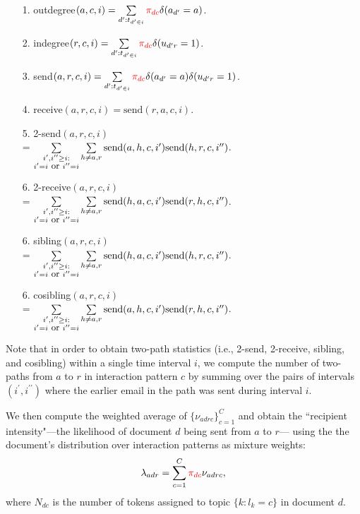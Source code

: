 \documentclass{article}
\begin{document}
\begin{itemize}
	\item[1.] outdegree$(a,c,i)=\sum\limits_{d^\prime:t_{d^\prime \in i}} \textcolor{red}{\pi_{dc}}\delta(a_{d^\prime} = a)$.
	\item[2.] indegree$(r,c,i)=\sum\limits_{d^\prime:t_{d^\prime \in i}} \textcolor{red}{\pi_{dc}}\delta(u_{d^\prime r} = 1)$.
	\item[3.] send$(a,r,c,i)=\sum\limits_{d^\prime:t_{d^\prime \in i}} \textcolor{red}{\pi_{dc}}\delta(a_{d^\prime} = a)\delta(u_{d^\prime r} = 1)$.
	\item[4.] receive$(a,r,c,i)=\mbox{send}(r,a,c,i)$.
	\item[5.] 2-send$(a,r,c,i) $\\= $\sum\limits_{\substack{i^\prime, i^{\prime\prime}\geq i:\\i^\prime = i \mbox{ \small or }i^{\prime\prime}=i}}\sum\limits_{h \neq a, r} \mbox{send}(a,h,c,i^\prime)\mbox{send}(h,r,c,i^{\prime\prime})$.
	\item[6.] 2-receive$(a,r,c,i) $\\= $\sum\limits_{\substack{i^\prime, i^{\prime\prime}\geq i:\\i^\prime = i \mbox{ \small or }i^{\prime\prime}=i}}\sum\limits_{h \neq a, r} \mbox{send}(h,a,c,i^\prime)\mbox{send}(r,h,c,i^{\prime\prime})$.
	\item[6.] sibling$(a,r,c,i) $\\= $\sum\limits_{\substack{i^\prime, i^{\prime\prime}\geq i:\\i^\prime = i \mbox{ \small or }i^{\prime\prime}=i}}\sum\limits_{h \neq a, r} \mbox{send}(h,a,c,i^\prime)\mbox{send}(h,r,c,i^{\prime\prime})$.
	\item[6.] cosibling$(a,r,c,i) $\\= $\sum\limits_{\substack{i^\prime, i^{\prime\prime}\geq i:\\i^\prime = i \mbox{ \small or }i^{\prime\prime}=i}}\sum\limits_{h \neq a, r} \mbox{send}(a,h,c,i^\prime)\mbox{send}(r,h,c,i^{\prime\prime})$.
\end{itemize}
Note that in order to obtain two-path statistics (i.e., 2-send, 2-receive, sibling, and cosibling) within a single time interval $i$, we compute the number of two-paths from $a$ to $r$ in interaction pattern $c$ by summing over the pairs of intervals $(i^\prime, i^{\prime\prime})$ where the earlier email in the path was sent during interval $i$. 

We then compute the weighted average of $\{\nu_{adrc}\}_{c=1}^C$ and obtain the ``recipient intensity"---the likelihood of document $d$ being sent from $a$ to $r$--- using the the document's distribution over interaction patterns as mixture weights:
\begin{equation}
\lambda_{adr} =\sum_{c=1}^{C} \textcolor{red}{\pi_{dc}}\nu_{adrc},
\end{equation}
where $N_{dc}$ is the number of tokens assigned to topic $\{k:l_k=c\}$ in document $d$. 
\end{document}
